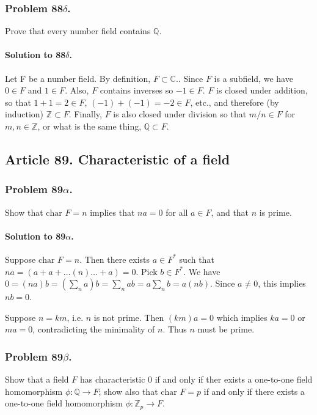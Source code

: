 \subsubsection{Problem 88$\delta$.}
Prove that every number field contains $\mathbb{Q}$.

\paragraph{Solution to 88$\delta$.}
Let F be a number field. By definition, $ F \subset \mathbb{C} $.. Since $F$ is
a subfield, we have $ 0 \in F $ and $ 1 \in F $. Also, $F$ contains inverses
so $ -1 \in F $. $F$ is closed under addition, so that $ 1 + 1 = 2 \in F $,
$(-1) + (-1) = -2 \in F$, etc., and therefore (by induction) $\mathbb{Z} \subset F$.
Finally, $F$ is also closed under division so that $m/n \in F$ for $m, n \in
\mathbb{Z}$, or what is the same thing, $ \mathbb{Q} \subset F $.

\subsection{Article 89. Characteristic of a field}

\subsubsection{Problem 89$\alpha$.}
Show that $\mbox{char } F = n$ implies that $na=0$ for all $a \in F$, and that
$n$ is prime.

\paragraph*{Solution to 89$\alpha$.}
Suppose $\mbox{char } F = n$. Then there exists $a \in F^*$ such that
$na = (a + a + \dots (n) \dots + a) = 0$. Pick $b \in F^*$. We have
$0 = (na)b = (\sum_n a)b = \sum_n ab = a \sum_n b = a(nb)$. Since $a \neq 0$, this
implies $nb = 0$.

Suppose $n = km$, i.e. $n$ is not prime. Then $(km)a = 0$ which implies $ka = 0$
or $ma = 0$, contradicting the minimality of $n$. Thus $n$ must be prime.

\subsubsection{Problem 89$\beta$.}
Show that a field $F$ has characteristic $0$ if and only if ther exists a
one-to-one field homomorphism $\phi : \mathbb{Q} \rightarrow F$; show also
that $\mbox{char } F = p$ if and only if there exists a one-to-one field
homomorphism $\phi : \mathbb{Z}_p \rightarrow F$.

